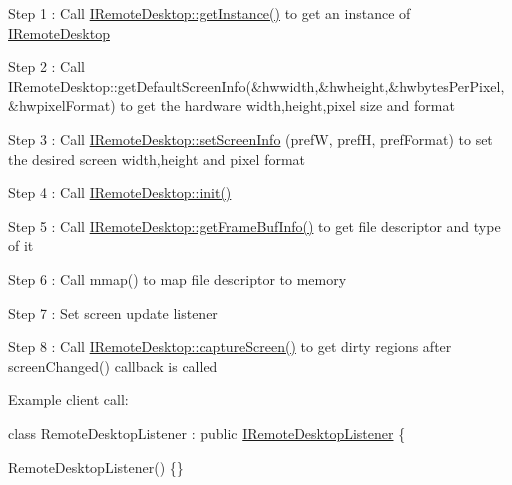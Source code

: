 \-Step 1 \-: \-Call \hyperlink{classknoxremotedesktop_1_1IRemoteDesktop_a86eefbec946d605470af069999763f74}{\-I\-Remote\-Desktop\-::get\-Instance()} to get an instance of \hyperlink{classknoxremotedesktop_1_1IRemoteDesktop}{\-I\-Remote\-Desktop}\par


\-Step 2 \-: \-Call \-I\-Remote\-Desktop\-::get\-Default\-Screen\-Info(\&hwwidth,\&hwheight,\&hwbytes\-Per\-Pixel,\&hwpixel\-Format) to get the hardware width,height,pixel size and format\par


\-Step 3 \-: \-Call \hyperlink{classknoxremotedesktop_1_1IRemoteDesktop_aeb13652779ac87ce9de9a8155f6dc60b}{\-I\-Remote\-Desktop\-::set\-Screen\-Info} (pref\-W, pref\-H, pref\-Format) to set the desired screen width,height and pixel format\par


\-Step 4 \-: \-Call \hyperlink{classknoxremotedesktop_1_1IRemoteDesktop_a7bed40d98c61713a69cf1dad8b37beae}{\-I\-Remote\-Desktop\-::init()}\par


\-Step 5 \-: \-Call \hyperlink{classknoxremotedesktop_1_1IRemoteDesktop_a57d5432823adfd7cfb72441469ccc98e}{\-I\-Remote\-Desktop\-::get\-Frame\-Buf\-Info()} to get file descriptor and type of it\par


\-Step 6 \-: \-Call mmap() to map file descriptor to memory\par


\-Step 7 \-: \-Set screen update listener\par


\-Step 8 \-: \-Call \hyperlink{classknoxremotedesktop_1_1IRemoteDesktop_a0ab5a0cf162a91c5e69abeed90f8ba09}{\-I\-Remote\-Desktop\-::capture\-Screen()} to get dirty regions after screen\-Changed() callback is called\par


\-Example client call\-:


\begin{DoxyPre}\end{DoxyPre}



\begin{DoxyPre} class RemoteDesktopListener : public \hyperlink{classknoxremotedesktop_1_1IRemoteDesktopListener}{IRemoteDesktopListener} \{\end{DoxyPre}



\begin{DoxyPre} 	 RemoteDesktopListener() \{\}\end{DoxyPre}



